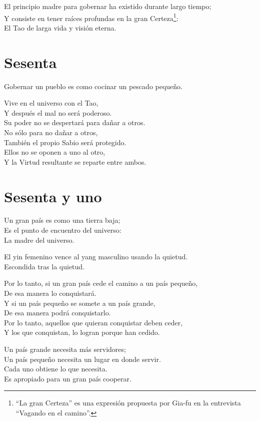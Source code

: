 \documentclass[book,b5paper,hidelinks,final]{memoir}
\begin{document}
	El principio madre para gobernar ha existido durante largo tiempo;\\
	Y consiste en tener raíces profundas en la gran Certeza\footnote{``La gran Certeza'' es una expresión propuesta por Gia-fu en la
		entrevista ``Vagando en el camino''.}:\\
	El Tao de larga vida y visión eterna.
	
	\chapter*{Sesenta}
	
	Gobernar un pueblo es como cocinar un pescado pequeño.
	
	Vive en el universo con el Tao,\\
	Y después el mal no será poderoso.\\
	Su poder no se despertará para dañar a otros.\\
	No sólo para no dañar a otros,\\
	También el propio Sabio será protegido.\\
	Ellos no se oponen a uno al otro,\\
	Y la Virtud resultante se reparte entre ambos.
	
	\chapter*{Sesenta y uno}
	
	Un gran país es como una tierra baja;\\
	Es el punto de encuentro del universo:\\
	La madre del universo.
	
	El yin femenino vence al yang masculino usando la quietud.\\
	Escondida tras la quietud.
	
	Por lo tanto, si un gran país cede el camino a un país pequeño,\\
	De esa manera lo conquistará.\\
	Y si un país pequeño se somete a un país grande,\\
	De esa manera podrá conquistarlo.\\
	Por lo tanto, aquellos que quieran conquistar deben ceder,\\
	Y los que conquistan, lo logran porque han cedido.
	
	Un país grande necesita más servidores;\\
	Un país pequeño necesita un lugar en donde servir.\\
	Cada uno obtiene lo que necesita.\\
	Es apropiado para un gran país cooperar.
	
\end{document}
